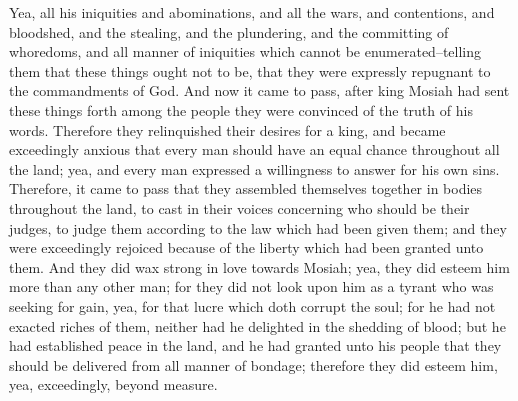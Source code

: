 Yea, all his iniquities and abominations, and all the wars, and contentions, and bloodshed, and the stealing, and the plundering, and the committing of whoredoms, and all manner of iniquities which cannot be enumerated--telling them that these things ought not to be, that they were expressly repugnant to the commandments of God.
\bverse \iffalse And now it came to pass, after king Mosiah had sent these things forth among the people they were convinced of the truth of his words. \fi
And now it came to pass, after king Mosiah had sent these things forth among the people they were convinced of the truth of his words.
\bverse \iffalse Therefore they relinquished their desires for a king, and became exceedingly anxious that every man should have an equal chance throughout all the land; yea, and every man expressed a willingness to answer for his own sins. \fi
Therefore they relinquished their desires for a king, and became exceedingly anxious that every man should have an equal chance throughout all the land; yea, and every man expressed a willingness to answer for his own sins.
\bverse \iffalse Therefore, it came to pass that they assembled themselves together in bodies throughout the land, to cast in their voices concerning who should be their judges, to judge them according to the law which had been given them; and they were exceedingly rejoiced because of the liberty which had been granted unto them. \fi
Therefore, it came to pass that they assembled themselves together in bodies throughout the land, to cast in their voices concerning who should be their judges, to judge them according to the law which had been given them; and they were exceedingly rejoiced because of the liberty which had been granted unto them.
\bverse \iffalse And they did wax strong in love towards Mosiah; yea, they did esteem him more than any other man; for they did not look upon him as a tyrant who was seeking for gain, yea, for that lucre which doth corrupt the soul; for he had not exacted riches of them, neither had he delighted in the shedding of blood; but he had established peace in the land, and he had granted unto his people that they should be delivered from all manner of bondage; therefore they did esteem him, yea, exceedingly, beyond measure. \fi
And they did wax strong in love towards Mosiah; yea, they did esteem him more than any other man; for they did not look upon him as a tyrant who was seeking for gain, yea, for that lucre which doth corrupt the soul; for he had not exacted riches of them, neither had he delighted in the shedding of blood; but he had established peace in the land, and he had granted unto his people that they should be delivered from all manner of bondage; therefore they did esteem him, yea, exceedingly, beyond measure.
